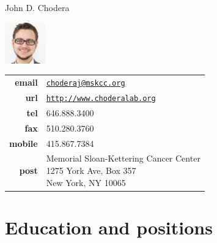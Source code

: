\documentclass[10pt]{article}
\begin{document}
\reversemarginpar
{\selectfont \LARGE John D. Chodera}\\[1cm]

\begin{minipage}[t]{1.2in}
\includegraphics[width=0.7in,valign=c]{images/john_chodera_sm.pdf}
\end{minipage}
\quad
\begin{minipage}[t]{6in}
\begin{tabular}{rl}
{\bf email} & \href{mailto:choderaj@mskcc.org}{\nolinkurl{choderaj@mskcc.org}}\\
{\bf url} & \href{http://www.choderalab.org}{\nolinkurl{http://www.choderalab.org}}\\[0.05in]
{\bf tel} & 646.888.3400\\[0.05in]
{\bf fax} & 510.280.3760 \\[0.05in]
{\bf mobile} & 415.867.7384\\[0.05in]
{\bf post} & 
\parbox[t]{3.0in}{Memorial Sloan-Kettering Cancer Center\\
1275 York Ave, Box 357\\
New York, NY 10065}
\end{tabular}
\end{minipage}


\section*{Education and positions}
\end{document}

